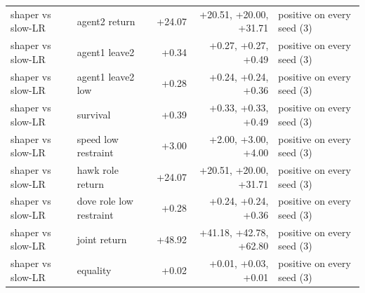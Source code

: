 \begin{tabular}{llrrl}
shaper vs slow-LR & agent2 return & +24.07 & +20.51, +20.00, +31.71 & positive on every seed (3) \\
shaper vs slow-LR & agent1 leave2 & +0.34 & +0.27, +0.27, +0.49 & positive on every seed (3) \\
shaper vs slow-LR & agent1 leave2 low & +0.28 & +0.24, +0.24, +0.36 & positive on every seed (3) \\
shaper vs slow-LR & survival & +0.39 & +0.33, +0.33, +0.49 & positive on every seed (3) \\
shaper vs slow-LR & speed low restraint & +3.00 & +2.00, +3.00, +4.00 & positive on every seed (3) \\
shaper vs slow-LR & hawk role return & +24.07 & +20.51, +20.00, +31.71 & positive on every seed (3) \\
shaper vs slow-LR & dove role low restraint & +0.28 & +0.24, +0.24, +0.36 & positive on every seed (3) \\
shaper vs slow-LR & joint return & +48.92 & +41.18, +42.78, +62.80 & positive on every seed (3) \\
shaper vs slow-LR & equality & +0.02 & +0.01, +0.03, +0.01 & positive on every seed (3) \\
\bottomrule
\end{tabular}
